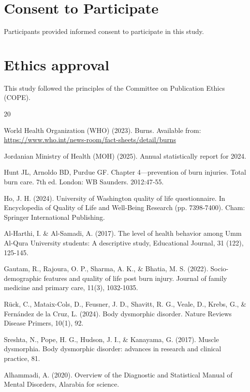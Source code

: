 \documentclass[10pt]{NSP1}
\begin{document}
	\section*{Consent to Participate}
	Participants provided informed consent to participate in this study.
	
	\section*{Ethics approval}
	This study followed the principles of the Committee on Publication Ethics (COPE).
	
	\begin{thebibliography}{20}
		
		 World Health Organization (WHO) (2023). Burns. Available from: \url{https://www.who.int/news-room/fact-sheets/detail/burns}
		
		 Jordanian Ministry of Health (MOH) (2025). Annual statistically report for 2024.
		
		 Hunt JL, Arnoldo BD, Purdue GF. Chapter 4—prevention of burn injuries. Total burn care. 7th ed. London: WB Saunders. 2012:47‑55.
		
		 Ho, J. H. (2024). University of Washington quality of life questionnaire. In Encyclopedia of Quality of Life and Well-Being Research (pp. 7398-7400). Cham: Springer International Publishing.
		
		 Al-Harthi, I. \& Al-Samadi, A. (2017). The level of health behavior among Umm Al-Qura University students: A descriptive study, Educational Journal, 31 (122), 125-145.
		
		 Gautam, R., Rajoura, O. P., Sharma, A. K., \& Bhatia, M. S. (2022). Socio-demographic features and quality of life post burn injury. Journal of family medicine and primary care, 11(3), 1032-1035.
		
		 Rück, C., Mataix-Cols, D., Feusner, J. D., Shavitt, R. G., Veale, D., Krebs, G., \& Fernández de la Cruz, L. (2024). Body dysmorphic disorder. Nature Reviews Disease Primers, 10(1), 92.
		
		 Sreshta, N., Pope, H. G., Hudson, J. I., \& Kanayama, G. (2017). Muscle dysmorphia. Body dysmorphic disorder: advances in research and clinical practice, 81.
		
		 Alhammadi, A. (2020). Overview of the Diagnostic and Statistical Manual of Mental Disorders, Alarabia for science.
		

\end{thebibliography}
\end{document}
